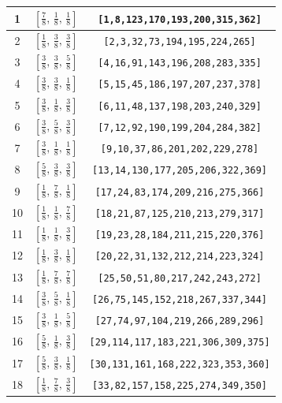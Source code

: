 \documentclass[fleqn,8pt]{jsarticle}
\begin{document}
\begin{longtable}{ccc}
1 & $\left[ \frac{7}{8},\, \frac{1}{8},\, \frac{1}{8} \right]$ & {\tt [1,8,123,170,193,200,315,362]} \\ \hline
2 & $\left[ \frac{1}{8},\, \frac{3}{8},\, \frac{3}{8} \right]$ & {\tt [2,3,32,73,194,195,224,265]} \\ \hline
3 & $\left[ \frac{3}{8},\, \frac{3}{8},\, \frac{5}{8} \right]$ & {\tt [4,16,91,143,196,208,283,335]} \\ \hline
4 & $\left[ \frac{3}{8},\, \frac{3}{8},\, \frac{1}{8} \right]$ & {\tt [5,15,45,186,197,207,237,378]} \\ \hline
5 & $\left[ \frac{3}{8},\, \frac{1}{8},\, \frac{3}{8} \right]$ & {\tt [6,11,48,137,198,203,240,329]} \\ \hline
6 & $\left[ \frac{3}{8},\, \frac{5}{8},\, \frac{3}{8} \right]$ & {\tt [7,12,92,190,199,204,284,382]} \\ \hline
7 & $\left[ \frac{3}{8},\, \frac{1}{8},\, \frac{1}{8} \right]$ & {\tt [9,10,37,86,201,202,229,278]} \\ \hline
8 & $\left[ \frac{5}{8},\, \frac{3}{8},\, \frac{3}{8} \right]$ & {\tt [13,14,130,177,205,206,322,369]} \\ \hline
9 & $\left[ \frac{1}{8},\, \frac{7}{8},\, \frac{1}{8} \right]$ & {\tt [17,24,83,174,209,216,275,366]} \\ \hline
10 & $\left[ \frac{1}{8},\, \frac{1}{8},\, \frac{7}{8} \right]$ & {\tt [18,21,87,125,210,213,279,317]} \\ \hline
11 & $\left[ \frac{1}{8},\, \frac{1}{8},\, \frac{3}{8} \right]$ & {\tt [19,23,28,184,211,215,220,376]} \\ \hline
12 & $\left[ \frac{1}{8},\, \frac{3}{8},\, \frac{1}{8} \right]$ & {\tt [20,22,31,132,212,214,223,324]} \\ \hline
13 & $\left[ \frac{1}{8},\, \frac{7}{8},\, \frac{7}{8} \right]$ & {\tt [25,50,51,80,217,242,243,272]} \\ \hline
14 & $\left[ \frac{3}{8},\, \frac{5}{8},\, \frac{1}{8} \right]$ & {\tt [26,75,145,152,218,267,337,344]} \\ \hline
15 & $\left[ \frac{3}{8},\, \frac{1}{8},\, \frac{5}{8} \right]$ & {\tt [27,74,97,104,219,266,289,296]} \\ \hline
16 & $\left[ \frac{5}{8},\, \frac{1}{8},\, \frac{3}{8} \right]$ & {\tt [29,114,117,183,221,306,309,375]} \\ \hline
17 & $\left[ \frac{5}{8},\, \frac{3}{8},\, \frac{1}{8} \right]$ & {\tt [30,131,161,168,222,323,353,360]} \\ \hline
18 & $\left[ \frac{1}{8},\, \frac{7}{8},\, \frac{3}{8} \right]$ & {\tt [33,82,157,158,225,274,349,350]} \\ \hline

\end{longtable}
\end{document}
